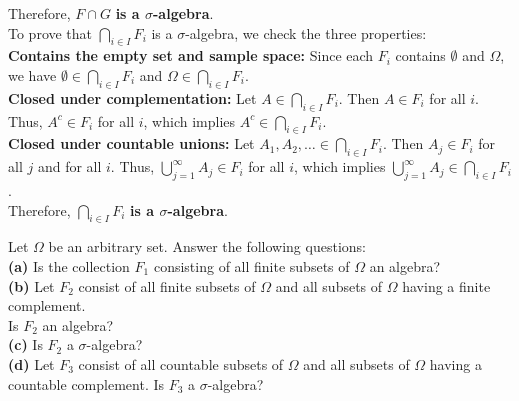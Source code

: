 \begin{solution}
    Therefore, \( F \cap G \) \textbf{is a \(\sigma\)-algebra}.\\
    
    To prove that \( \bigcap_{i \in I} F_i \) is a \(\sigma\)-algebra, we check the three properties:\\
    
    \textbf{Contains the empty set and sample space:} Since each \( F_i \) contains \( \emptyset \) and \( \Omega \), we have \( \emptyset \in \bigcap_{i \in I} F_i \) and \( \Omega \in \bigcap_{i \in I} F_i \).\\
        
    \textbf{Closed under complementation:} Let \( A \in \bigcap_{i \in I} F_i \). Then \( A \in F_i \) for all \( i \). Thus, \( A^c \in F_i \) for all \( i \), which implies \( A^c \in \bigcap_{i \in I} F_i \).\\
    
    \textbf{Closed under countable unions:} Let \( A_1, A_2, \ldots \in \bigcap_{i \in I} F_i \). Then \( A_j \in F_i \) for all \( j \) and for all \( i \). Thus, \( \bigcup_{j=1}^\infty A_j \in F_i \) for all \( i \), which implies \( \bigcup_{j=1}^\infty A_j \in \bigcap_{i \in I} F_i \).\\
    
    Therefore, \( \bigcap_{i \in I} F_i \) \textbf{is a \(\sigma\)-algebra}.\\
\end{solution}

\begin{exercise}
    Let \(\Omega\) be an arbitrary set. Answer the following questions:\\
    \textbf{(a)} Is the collection \(F_1\) consisting of all finite subsets of \(\Omega\) an algebra?\\
    \textbf{(b)} Let \(F_2\) consist of all finite subsets of \(\Omega\) and all subsets of \(\Omega\) having a finite complement.\\
    Is \(F_2\) an algebra?\\
    \textbf{(c)} Is \(F_2\) a \(\sigma\)-algebra?\\
    \textbf{(d)} Let \(F_3\) consist of all countable subsets of \(\Omega\) and all subsets of \(\Omega\) having a countable complement. Is \(F_3\) a \(\sigma\)-algebra?
\end{exercise}

